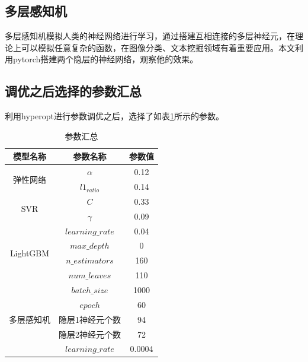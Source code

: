 \documentclass{article}
\begin{document}
\begin{multicols}{2}
\subsection{多层感知机}
多层感知机模拟人类的神经网络进行学习，通过搭建互相连接的多层神经元，在理论上可以模拟任意复杂的函数，在图像分类、文本挖掘领域有着重要应用。本文利用pytorch搭建两个隐层的神经网络，观察他的效果。
\subsection{调优之后选择的参数汇总}
利用hyperopt进行参数调优之后，选择了如表\ref{tab:参数汇总}所示的参数。
\begin{table}[H]
	\centering 
	\begin{tabular}{|c|cc|}
		\hline 
		模型名称 & 参数名称 & 参数值 \\\hline 
		\multirow{2}{*}{弹性网络} & $\alpha$ & 0.12\\  
		 & $l1_{ratio}$ & 0.14 \\\hline 
		 \multirow{2}{*}{SVR} & $C$ & 0.33 \\
		  & $\gamma$ & 0.09\\\hline
		  \multirow{4}{*}{LightGBM}
		  & $learning\_rate$ & 0.04\\
		  & $max\_depth$ & 0\\
		  & $n\_estimators$ & 160\\
		  & $num\_leaves$ & 110\\\hline 
		  \multirow{5}{*}{多层感知机} & $batch\_size$ & 1000\\
		  
		  & $epoch$ & 60\\
		  & 隐层1神经元个数 & 94\\
		  & 隐层2神经元个数 & 72\\ 
		  & $learning\_rate$ & 0.0004\\\hline  
	\end{tabular}
\caption{参数汇总}
\label{tab:参数汇总}
\end{table}


\end{multicols}
\end{document}
